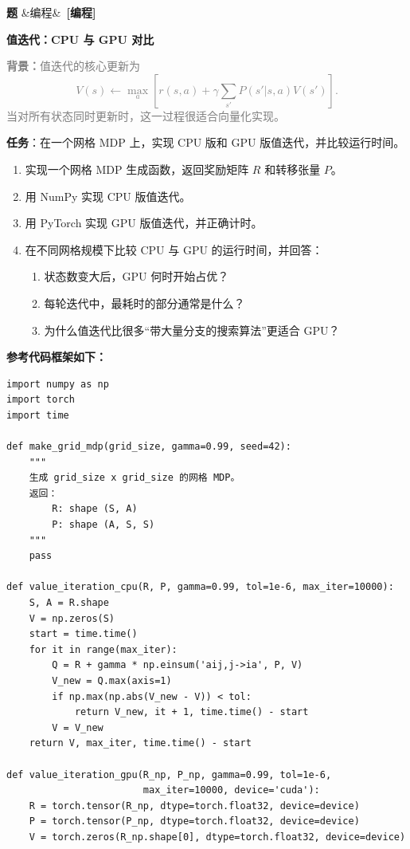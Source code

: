 \documentclass[12pt, a4paper]{article}
\newcounter{probcnt}
\newenvironment{problem}[1][]{%
  \stepcounter{probcnt}
  \begin{mdframed}[linecolor=black!30, backgroundcolor=gray!4,
    innertopmargin=8pt, innerbottommargin=8pt,
    innerleftmargin=10pt, innerrightmargin=10pt,
    skipabove=10pt, skipbelow=4pt]
  \noindent\textbf{题 \theprobcnt}\ifx&#1&\else\ \textbf{[#1]}\fi\quad
}{%
  \end{mdframed}
}
\newenvironment{subproblems}{%
  \begin{enumerate}[label=(\alph*), leftmargin=1.8em, topsep=4pt, itemsep=4pt]
}{%
  \end{enumerate}
}
\newcommand{\context}[1]{\smallskip\noindent\textcolor{gray}{\small \textbf{背景：}#1}\smallskip}
\begin{document}
\begin{problem}[编程]
\textbf{值迭代：CPU 与 GPU 对比}

\context{值迭代的核心更新为
$$
V(s)\leftarrow \max_a \left[r(s,a)+\gamma\sum_{s'}P(s'|s,a)V(s')\right].
$$
当对所有状态同时更新时，这一过程很适合向量化实现。}

\textbf{任务}：在一个网格 MDP 上，实现 CPU 版和 GPU 版值迭代，并比较运行时间。

\begin{subproblems}
    \item 实现一个网格 MDP 生成函数，返回奖励矩阵 $R$ 和转移张量 $P$。
    \item 用 NumPy 实现 CPU 版值迭代。
    \item 用 PyTorch 实现 GPU 版值迭代，并正确计时。
    \item 在不同网格规模下比较 CPU 与 GPU 的运行时间，并回答：
    \begin{enumerate}[label=\roman*., leftmargin=2em]
        \item 状态数变大后，GPU 何时开始占优？
        \item 每轮迭代中，最耗时的部分通常是什么？
        \item 为什么值迭代比很多“带大量分支的搜索算法”更适合 GPU？
    \end{enumerate}
\end{subproblems}

\textbf{参考代码框架如下：}

\begin{lstlisting}
import numpy as np
import torch
import time

def make_grid_mdp(grid_size, gamma=0.99, seed=42):
    """
    生成 grid_size x grid_size 的网格 MDP。
    返回：
        R: shape (S, A)
        P: shape (A, S, S)
    """
    pass

def value_iteration_cpu(R, P, gamma=0.99, tol=1e-6, max_iter=10000):
    S, A = R.shape
    V = np.zeros(S)
    start = time.time()
    for it in range(max_iter):
        Q = R + gamma * np.einsum('aij,j->ia', P, V)
        V_new = Q.max(axis=1)
        if np.max(np.abs(V_new - V)) < tol:
            return V_new, it + 1, time.time() - start
        V = V_new
    return V, max_iter, time.time() - start

def value_iteration_gpu(R_np, P_np, gamma=0.99, tol=1e-6,
                        max_iter=10000, device='cuda'):
    R = torch.tensor(R_np, dtype=torch.float32, device=device)
    P = torch.tensor(P_np, dtype=torch.float32, device=device)
    V = torch.zeros(R_np.shape[0], dtype=torch.float32, device=device)


\end{lstlisting}
\end{problem}
\end{document}
